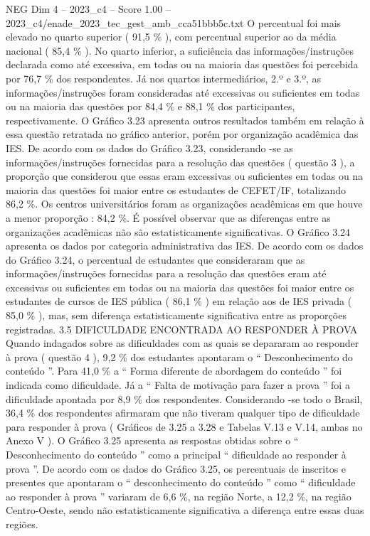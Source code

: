 \begin{textsample}{NEG Dim 4 – 2023\_c4 – Score 1.00 – 2023\_c4/enade\_2023\_tec\_gest\_amb\_cca51bbb5c.txt}
O percentual foi mais elevado no quarto superior ( 91,5 \% ), com percentual superior ao da média nacional ( 85,4 \% ).
No quarto inferior, a suficiência das informações/instruções declarada como até excessiva, em todas ou na maioria das questões foi percebida por 76,7 \% dos respondentes.
Já nos quartos intermediários, 2.º e 3.º, as informações/instruções foram consideradas até excessivas ou suficientes em todas ou na maioria das questões por 84,4 \% e 88,1 \% dos participantes, respectivamente.
O Gráfico 3.23 apresenta outros resultados também em relação à essa questão retratada no gráfico anterior, porém por organização acadêmica das IES.
De acordo com os dados do Gráfico 3.23, considerando -se as informações/instruções fornecidas para a resolução das questões ( questão 3 ), a proporção que considerou que essas eram excessivas ou suficientes em todas ou na maioria das questões foi maior entre os estudantes de CEFET/IF, totalizando 86,2 \%.
Os centros universitários foram as organizações acadêmicas em que houve a menor proporção : 84,2 \%.
É possível observar que as diferenças entre as organizações acadêmicas não são estatisticamente significativas.
O Gráfico 3.24 apresenta os dados por categoria administrativa das IES.
De acordo com os dados do Gráfico 3.24, o percentual de estudantes que consideraram que as informações/instruções fornecidas para a resolução das questões eram até excessivas ou suficientes em todas ou na maioria das questões foi maior entre os estudantes de cursos de IES pública ( 86,1 \% ) em relação aos de IES privada ( 85,0 \% ), mas, sem diferença estatisticamente significativa entre as proporções registradas. 3.5 DIFICULDADE ENCONTRADA AO RESPONDER À PROVA Quando indagados sobre as dificuldades com as quais se depararam ao responder à prova ( questão 4 ), 9,2 \% dos estudantes apontaram o “ Desconhecimento do conteúdo ”.
Para 41,0 \% a “ Forma diferente de abordagem do conteúdo ” foi indicada como dificuldade.
Já a “ Falta de motivação para fazer a prova ” foi a dificuldade apontada por 8,9 \% dos respondentes.
Considerando -se todo o Brasil, 36,4 \% dos respondentes afirmaram que não tiveram qualquer tipo de dificuldade para responder à prova ( Gráficos de 3.25 a 3.28 e Tabelas V.13 e V.14, ambas no Anexo V ).
O Gráfico 3.25 apresenta as respostas obtidas sobre o “ Desconhecimento do conteúdo ” como a principal “ dificuldade ao responder à prova ”.
De acordo com os dados do Gráfico 3.25, os percentuais de inscritos e presentes que apontaram o “ desconhecimento do conteúdo ” como “ dificuldade ao responder à prova ” variaram de 6,6 \%, na região Norte, a 12,2 \%, na região Centro-Oeste, sendo não estatisticamente significativa a diferença entre essas duas regiões.

\end{textsample}
